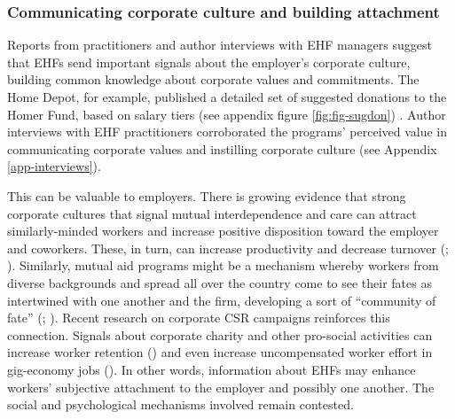 \documentclass[
  11pt,
  oneside]{article}
\begin{document}
\subsubsection{Communicating corporate culture and building attachment}\label{communicating-corporate-culture-and-building-attachment}

Reports from practitioners and author interviews with EHF managers suggest that EHFs send important signals about the employer's corporate culture, building common knowledge about corporate values and commitments. The Home Depot, for example, published a detailed set of suggested donations to the Homer Fund, based on salary tiers (see appendix figure \ref{fig:fig-sugdon}) . Author interviews with EHF practitioners corroborated the programs' perceived value in communicating corporate values and instilling corporate culture (see Appendix \ref{app-interviews}).

This can be valuable to employers. There is growing evidence that strong corporate cultures that signal mutual interdependence and care can attract similarly-minded workers and increase positive disposition toward the employer and coworkers. These, in turn, can increase productivity and decrease turnover (; ). Similarly, mutual aid programs might be a mechanism whereby workers from diverse backgrounds and spread all over the country come to see their fates as intertwined with one another and the firm, developing a sort of ``community of fate'' (; ). Recent research on corporate CSR campaigns reinforces this connection. Signals about corporate charity and other pro-social activities can increase worker retention () and even increase uncompensated worker effort in gig-economy jobs (). In other words, information about EHFs may enhance workers' subjective attachment to the employer and possibly one another. The social and psychological mechanisms involved remain contested.
\end{document}
